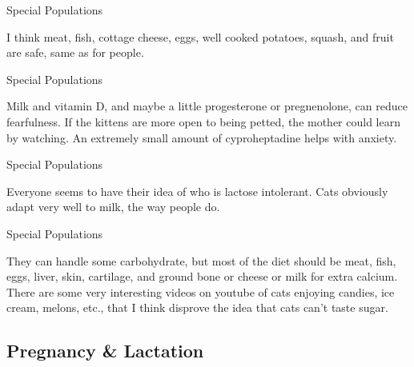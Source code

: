 \documentclass[11pt,oneside,openany,extrafontsizes]{memoir}
\begin{document}
\begin{standalonequote}{Special Populations}

    \begin{answer}
      I think meat, fish, cottage cheese, eggs, well cooked potatoes, squash, and fruit are safe, same as for people.
    \end{answer}
\end{standalonequote}

\begin{standalonequote}{Special Populations}

    \begin{answer}
      Milk and vitamin D, and maybe a little progesterone or pregnenolone, can reduce fearfulness. If the kittens are more open to being petted, the mother could learn by watching. An extremely small amount of cyproheptadine helps with anxiety.
    \end{answer}
\end{standalonequote}

\begin{standalonequote}{Special Populations}

    \begin{answer}
      Everyone seems to have their idea of who is lactose intolerant. Cats obviously adapt very well to milk, the way people do. 
    \end{answer}
\end{standalonequote}

\begin{standalonequote}{Special Populations}

    \begin{answer}
      They can handle some carbohydrate, but most of the diet should be meat, fish, eggs, liver, skin, cartilage, and ground bone or cheese or milk for extra calcium. There are some very interesting videos on youtube of cats enjoying candies, ice cream, melons, etc., that I think disprove the idea that cats can't taste sugar.
    \end{answer}
\end{standalonequote}

\subsection{Pregnancy \& Lactation}
\end{document}
